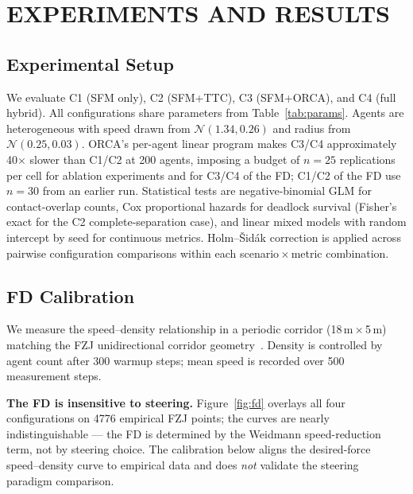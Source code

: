 \documentclass[a4paper,twoside]{article}
\begin{document}
\section{\uppercase{Experiments and Results}}
\label{sec:experiments}

\subsection{Experimental Setup}

We evaluate C1 (SFM only), C2 (SFM+TTC), C3 (SFM+ORCA), and C4 (full hybrid). All configurations share parameters from Table~\ref{tab:params}. Agents are heterogeneous with speed drawn from $\mathcal{N}(1.34,0.26)$ and radius from $\mathcal{N}(0.25,0.03)$. ORCA's per-agent linear program makes C3/C4 approximately 40$\times$ slower than C1/C2 at 200 agents, imposing a budget of $n=25$ replications per cell for ablation experiments and for C3/C4 of the FD; C1/C2 of the FD use $n=30$ from an earlier run. Statistical tests are negative-binomial GLM for contact-overlap counts, Cox proportional hazards for deadlock survival (Fisher's exact for the C2 complete-separation case), and linear mixed models with random intercept by seed for continuous metrics. Holm--\v{S}id\'ak correction is applied across pairwise configuration comparisons within each scenario\,$\times$\,metric combination.

\subsection{FD Calibration}
\label{sec:fd-validation}

We measure the speed--density relationship in a periodic corridor (18\,m\,$\times$\,5\,m) matching the FZJ unidirectional corridor geometry~\cite{FZJ13a}. Density is controlled by agent count after 300 warmup steps; mean speed is recorded over 500 measurement steps.

\textbf{The FD is insensitive to steering.}
Figure~\ref{fig:fd} overlays all four configurations on 4776 empirical FZJ points; the curves are nearly indistinguishable --- the FD is determined by the Weidmann speed-reduction term, not by steering choice. The calibration below aligns the desired-force speed--density curve to empirical data and does \emph{not} validate the steering paradigm comparison.
\end{document}
